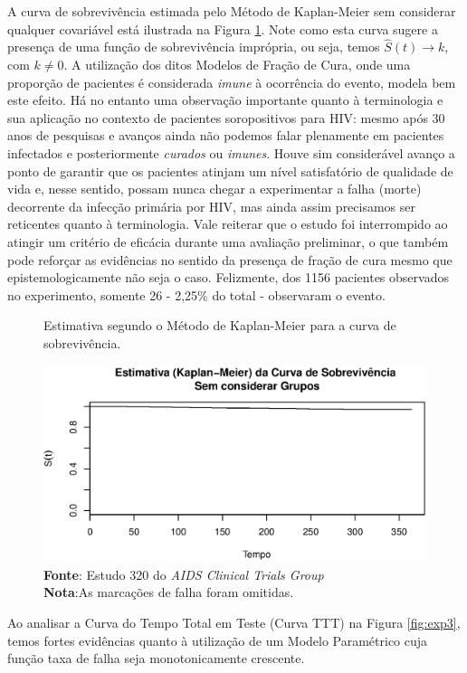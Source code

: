 \documentclass[
	12pt,				%
	openright,			%
	twoside,			%
	a4paper,			%
	english,			%
	brazil				%
	]{abntex2}
\begin{document}
A curva de sobrevivência estimada pelo Método de Kaplan-Meier sem considerar qualquer covariável está ilustrada na Figura \ref{fig:exp2}. Note como esta curva sugere a presença de uma função de sobrevivência imprópria, ou seja, temos $\hat{S}(t) \to k$, com $k \neq 0$. A utilização dos ditos Modelos de Fração de Cura, onde uma proporção de pacientes é considerada \textit{imune} à ocorrência do evento, modela bem este efeito. Há no entanto uma observação importante quanto à terminologia e sua aplicação no contexto de pacientes soropositivos para HIV: mesmo após 30 anos de pesquisas e avanços ainda não podemos falar plenamente em pacientes infectados e posteriormente \textit{curados} ou \textit{imunes}. Houve sim considerável avanço a ponto de garantir que os pacientes atinjam um nível satisfatório de qualidade de vida e, nesse sentido, possam nunca chegar a experimentar a falha (morte) decorrente da infecção primária por HIV, mas ainda assim precisamos ser reticentes quanto à terminologia. Vale reiterar que o estudo foi interrompido ao atingir um critério de eficácia durante uma avaliação preliminar, o que também pode reforçar as evidências no sentido da presença de fração de cura mesmo que epistemologicamente não seja o caso. Felizmente, dos 1156 pacientes observados no experimento, somente 26 - 2,25\% do total - observaram o evento.

\begin{figure}[!ht]
	\centering
    \caption{Estimativa segundo o Método de Kaplan-Meier para a curva de sobrevivência.}
    \label{fig:exp2}
    \includegraphics[scale = 0.9]{Rplot01}
    \caption*{\tiny{\textbf{Fonte}: Estudo 320 do \textit{AIDS Clinical Trials Group}} \\  \tiny{\textbf{Nota}:As marcações de falha foram omitidas.}}
\end{figure}

Ao analisar a Curva do Tempo Total em Teste (Curva TTT) na Figura \ref{fig:exp3}, temos fortes evidências quanto à utilização de um Modelo Paramétrico cuja função taxa de falha seja monotonicamente crescente.
\end{document}
